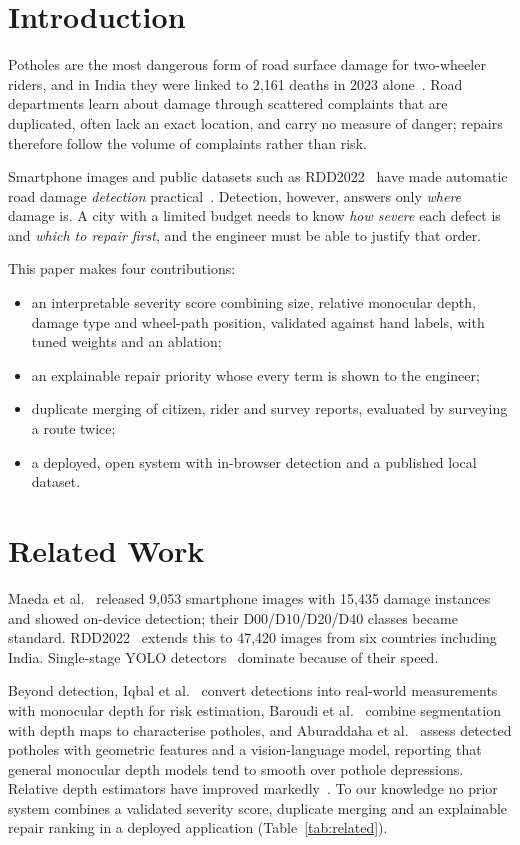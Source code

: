 \documentclass[conference]{IEEEtran}
\begin{document}
\section{Introduction}
Potholes are the most dangerous form of road surface damage for two-wheeler riders, and in India they
were linked to 2,161 deaths in 2023 alone~\cite{morth2023}. Road departments learn about damage
through scattered complaints that are duplicated, often lack an exact location, and carry no measure
of danger; repairs therefore follow the volume of complaints rather than risk.

Smartphone images and public datasets such as RDD2022~\cite{arya2022rdd} have made automatic road
damage \emph{detection} practical~\cite{maeda2018}. Detection, however, answers only \emph{where}
damage is. A city with a limited budget needs to know \emph{how severe} each defect is and \emph{which
to repair first}, and the engineer must be able to justify that order.

This paper makes four contributions:
\begin{itemize}
\item an interpretable severity score combining size, relative monocular depth, damage type and
wheel-path position, validated against hand labels, with tuned weights and an ablation;
\item an explainable repair priority whose every term is shown to the engineer;
\item duplicate merging of citizen, rider and survey reports, evaluated by surveying a route twice;
\item a deployed, open system with in-browser detection and a published local dataset.
\end{itemize}

\section{Related Work}
Maeda et al.~\cite{maeda2018} released 9,053 smartphone images with 15,435 damage instances and
showed on-device detection; their D00/D10/D20/D40 classes became standard. RDD2022~\cite{arya2022rdd}
extends this to 47,420 images from six countries including India. Single-stage YOLO
detectors~\cite{redmon2016yolo,jocher2024yolo11} dominate because of their speed.

Beyond detection, Iqbal et al.~\cite{iqbal2022v2} convert detections into real-world measurements with
monocular depth for risk estimation, Baroudi et al.~\cite{baroudi2025} combine segmentation with depth
maps to characterise potholes, and Aburaddaha et al.~\cite{aburaddaha2026} assess detected potholes
with geometric features and a vision-language model, reporting that general monocular depth models
tend to smooth over pothole depressions. Relative depth estimators have improved
markedly~\cite{ranftl2022midas,yang2024dav2}. To our knowledge no prior system combines a validated
severity score, duplicate merging and an explainable repair ranking in a deployed application
(Table~\ref{tab:related}).
\end{document}
